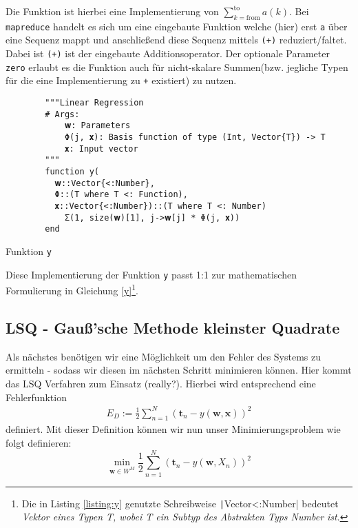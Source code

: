 \documentclass{article}
\theoremstyle{plain} %
\theoremstyle{definition} %
\begin{document}
Die Funktion ist hierbei eine Implementierung von $\sum_{k=\text{from}}^\text{to}a(k)$. Bei \texttt{mapreduce} handelt es sich um eine eingebaute Funktion welche (hier) erst \texttt{a} über eine Sequenz mappt und anschließend diese Sequenz mittels \texttt{(+)} reduziert/faltet. Dabei ist \texttt{(+)} ist der eingebaute Additionsoperator. Der optionale Parameter \texttt{zero} erlaubt es die Funktion auch für nicht-skalare Summen(bzw. jegliche Typen für die eine Implementierung zu \texttt{+} existiert) zu nutzen.

\begin{listing}[!ht]
    \begin{verbatim}
        """Linear Regression
        # Args:
            𝐰: Parameters
            Φ(j, 𝐱): Basis function of type (Int, Vector{T}) -> T
            𝐱: Input vector
        """
        function y(
          𝐰::Vector{<:Number},
          Φ::(T where T <: Function),
          𝐱::Vector{<:Number})::(T where T <: Number)
            Σ(1, size(𝐰)[1], j->𝐰[j] * Φ(j, 𝐱))
        end
    \end{verbatim}
    \caption{Funktion \texttt{y}}
    \label{listing:y}
\end{listing}

Diese Implementierung der Funktion \texttt{y} passt 1:1 zur mathematischen Formulierung in Gleichung \ref{y}\footnote{Die in Listing \ref{listing:y} genutzte Schreibweise \texttt|Vector{<:Number}| bedeutet \emph{Vektor eines Typen T, wobei T ein Subtyp des Abstrakten Typs Number ist}.}.


\subsection{LSQ - Gauß'sche Methode kleinster Quadrate}

Als nächstes benötigen wir eine Möglichkeit um den Fehler des Systems zu ermitteln - sodass wir diesen im nächsten Schritt minimieren können. Hier kommt das LSQ Verfahren zum Einsatz (really?). Hierbei wird entsprechend \cite[S. 140f]{Bishop} eine Fehlerfunktion
\begin{align}
    E_D := \frac{1}{2}\sum_{n=1}^{N}(\mathbf{t}_n - y(\mathbf{w}, \mathbf{x}))^2
\end{align}
definiert.
Mit dieser Definition können wir nun unser Minimierungsproblem wie folgt definieren:
$$
    \min_{\mathbf{w} \in W^M} \frac{1}{2}\sum_{n=1}^{N}(\mathbf{t}_n - y(\mathbf{w}, X_n))^2
$$ 
\end{document}
